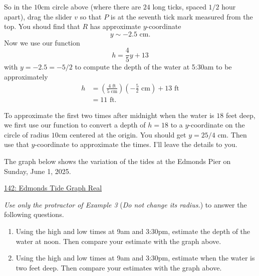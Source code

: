 \documentclass{ximera}
\begin{document}
\begin{example}
\begin{explanation}
\begin{enumerate}
So in the $10$cm circle above (where there are $24$ long ticks, spaced $1/2$ hour apart), drag the slider $v$ so that $P$ is at the seventh tick mark measured from the top. You shoud find that $R$ has approximate $y$-coordinate
\[
  y \sim -2.5 \text{ cm}.
\] 
Now we use our function 
\[
  h = \frac{4}{5}y + 13
\]
with $y=-2.5 = -5/2$ to compute the depth of the water at 5:30am to be approximately
\begin{align*}
 h  &= \left(\frac{4 \text{ ft}}{5\text{ cm}}\right)\left( -\frac{5}{2} \text{ cm}\right) + 13\text{ ft} \\
     &= 11 \text{ ft}.
\end{align*}

To approximate the first two times after midnight when the water is $18$ feet deep, we first use our function to convert a depth of $h=18$ to a $y$-coordinate on the circle of radius $10$cm centered at the origin. You should get $y=25/4$ cm. Then use that $y$-coordinate to approximate the times. I'll leave the details to you.

\end{enumerate}
\end{explanation}

\end{example}

\begin{example} \label{Ex:L3rdsfr43r}
The graph below shows the variation of the tides at the Edmonds Pier on Sunday, June 1, 2025.
\begin{onlineOnly}
    \begin{center}
\end{center}
\end{onlineOnly}

\href{https://www.desmos.com/calculator/5921617274}{142: Edmonds Tide Graph Real}

\emph{Use only the protractor of Example 3} (\emph{Do not change its radius.}) to answer the following questions.

\begin{enumerate}
\item Using the high and low times at 9am and 3:30pm, estimate the depth of the water at noon. Then compare your estimate with the graph above.

\item Using the high and low times at 9am and 3:30pm, estimate when the water is two feet deep. Then compare your estimates with the graph above.
\end{enumerate}



\end{example}
\end{document}
